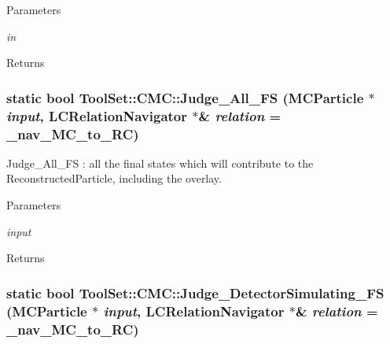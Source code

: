 \begin{DoxyParams}{Parameters}
\item[{\em in}]\end{DoxyParams}
\begin{DoxyReturn}{Returns}

\end{DoxyReturn}
\hypertarget{classToolSet_1_1CMC_ad5ee7a4ddd73dca280d23d5656ac106d}{
\subsubsection[{Judge\_\-All\_\-FS}]{\setlength{\rightskip}{0pt plus 5cm}static bool ToolSet::CMC::Judge\_\-All\_\-FS (MCParticle $\ast$ {\em input}, \/  LCRelationNavigator $\ast$\& {\em relation} = {\ttfamily \_\-nav\_\-MC\_\-to\_\-RC})}}
\label{classToolSet_1_1CMC_ad5ee7a4ddd73dca280d23d5656ac106d}


Judge\_\-All\_\-FS : all the final states which will contribute to the ReconstructedParticle, including the overlay. 
\begin{DoxyParams}{Parameters}
\item[{\em input}]\end{DoxyParams}
\begin{DoxyReturn}{Returns}

\end{DoxyReturn}
\hypertarget{classToolSet_1_1CMC_a15a940ad524f57e93daa4c23a54c5992}{
\subsubsection[{Judge\_\-DetectorSimulating\_\-FS}]{\setlength{\rightskip}{0pt plus 5cm}static bool ToolSet::CMC::Judge\_\-DetectorSimulating\_\-FS (MCParticle $\ast$ {\em input}, \/  LCRelationNavigator $\ast$\& {\em relation} = {\ttfamily \_\-nav\_\-MC\_\-to\_\-RC})}}
\label{classToolSet_1_1CMC_a15a940ad524f57e93daa4c23a54c5992}


